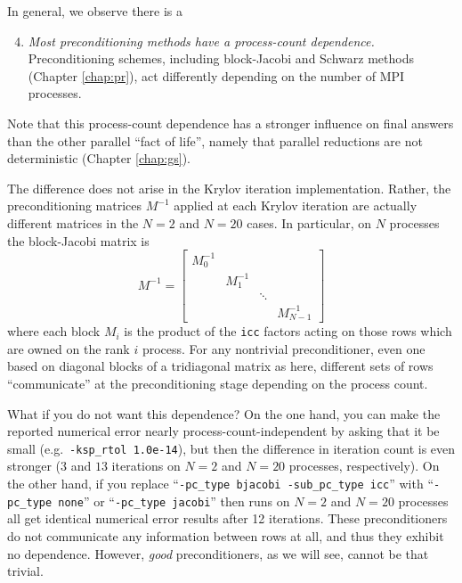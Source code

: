 In general, we observe there is a

\begin{enumerate}
\setcounter{enumi}{3}
\item \emph{Most preconditioning methods have a process-count dependence.}  Preconditioning schemes, including block-Jacobi and Schwarz methods (Chapter \ref{chap:pr}), act differently depending on the number of MPI processes.
\end{enumerate}

\noindent Note that this process-count dependence has a stronger influence on final answers than the other parallel ``fact of life'', namely that parallel reductions are not deterministic (Chapter \ref{chap:gs}).

The difference does not arise in the Krylov iteration implementation.  Rather, the preconditioning matrices $M^{-1}$ applied at each Krylov iteration are actually different matrices in the $N=2$ and $N=20$ cases.  In particular, on $N$ processes the block-Jacobi matrix is
\begin{equation}
  M^{-1} = \begin{bmatrix}
           M_0^{-1} & & & \\
           & M_1^{-1} & & \\
           & & \ddots & \\
           & & & M_{N-1}^{-1}
           \end{bmatrix}   \label{eq:ls:parallelpreconditioner}
\end{equation}
where each block $M_i$ is the product of the \texttt{icc} factors acting on those rows which are owned on the rank $i$ process.  For any nontrivial preconditioner, even one based on diagonal blocks of a tridiagonal matrix as here, different sets of rows ``communicate'' at the preconditioning stage depending on the process count.

What if you do not want this dependence?  On the one hand, you can make the reported numerical error nearly process-count-independent by asking that it be small (e.g.~\texttt{-ksp\_rtol 1.0e-14}), but then the difference in iteration count is even stronger ($3$ and $13$ iterations on $N=2$ and $N=20$ processes, respectively).  On the other hand, if you replace ``\texttt{-pc\_type bjacobi -sub\_pc\_type icc}'' with ``\texttt{-pc\_type none}'' or ``\texttt{-pc\_type jacobi}'' then runs on $N=2$ and $N=20$ processes all get identical numerical error results after 12 iterations.  These preconditioners do not communicate any information between rows at all, and thus they exhibit no dependence.  However, \emph{good} preconditioners, as we will see, cannot be that trivial.

